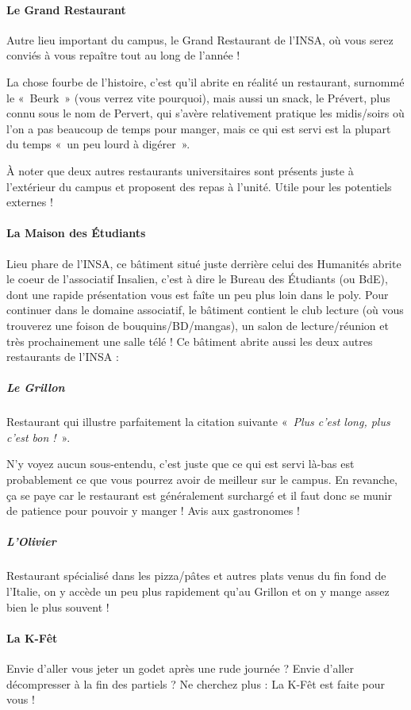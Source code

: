 \paragraph{Le Grand Restaurant}
Autre lieu important du campus, le Grand Restaurant de l'INSA, où vous
serez conviés à vous repaître tout au long de l'année ! 

La chose fourbe de l'histoire, c'est qu'il abrite en réalité un restaurant, surnommé le «~Beurk~» (vous verrez vite pourquoi), mais aussi
un snack, le Prévert, plus connu sous le nom de Pervert, qui s'avère
relativement pratique les midis/soirs où l'on a pas beaucoup de temps pour manger, mais ce
qui est servi est la plupart du temps «~un peu lourd à digérer~».

À noter que deux autres restaurants universitaires sont présents juste à l'extérieur du campus et proposent des repas à l'unité. Utile pour les potentiels externes !

\paragraph{La Maison des Étudiants}
Lieu phare de l'INSA, ce bâtiment situé juste derrière celui des Humanités
abrite le coeur de l'associatif Insalien, c'est à dire le Bureau des Étudiants (ou
BdE), dont une rapide présentation vous est faîte un peu plus loin dans le
poly. Pour continuer dans le domaine associatif, le bâtiment contient le
club lecture (où vous trouverez une foison de bouquins/BD/mangas), un salon de
lecture/réunion et très prochainement une salle télé !
Ce bâtiment abrite aussi les deux autres restaurants de l'INSA :
\subparagraph{Le Grillon}
Restaurant qui illustre parfaitement la citation suivante «~\emph{Plus c'est long,
	   plus c'est bon !}~».

N'y voyez aucun sous-entendu, c'est juste que ce qui est servi là-bas est probablement
ce que vous pourrez avoir de meilleur sur le campus. En revanche, ça se paye car le restaurant 
est généralement surchargé et il faut donc se munir de patience pour pouvoir y manger ! Avis aux gastronomes ! 
\subparagraph{L'Olivier}
Restaurant  spécialisé dans les pizza/pâtes et autres plats venus du fin
fond de l'Italie, on y accède un peu plus rapidement qu'au Grillon et on y
mange assez bien le plus souvent !

\paragraph{La K-Fêt}
Envie d'aller vous jeter un godet après une rude journée ? Envie d'aller
décompresser à la fin des partiels ? Ne cherchez plus : La K-Fêt est faite
pour vous !

